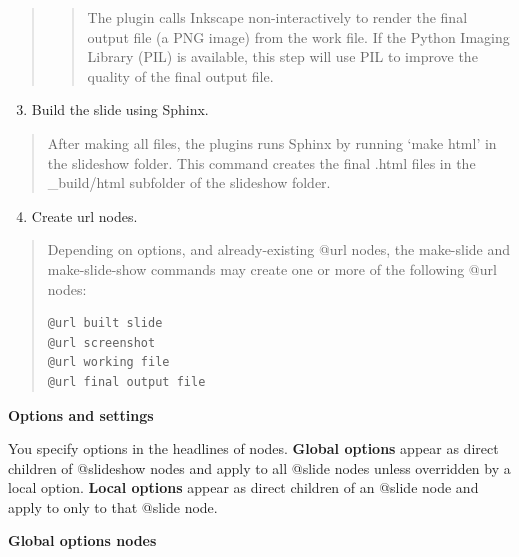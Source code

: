 \documentclass[a4paper,10pt,english]{sphinxmanual}
\begin{document}
\begin{quote}
\begin{enumerate}
\end{enumerate}
\begin{quote}

The plugin calls Inkscape non-interactively to
render the final output file (a PNG image)
from the work file. If the Python Imaging
Library (PIL) is available, this step will use
PIL to improve the quality of the final output
file.
\end{quote}
\end{quote}
\begin{enumerate}
\setcounter{enumi}{2}
\item {} 
Build the slide using Sphinx.

\end{enumerate}
\begin{quote}

After making all files, the plugins runs Sphinx
by running `make html' in the slideshow folder.
This command creates the final .html files in the
\_build/html subfolder of the slideshow folder.
\end{quote}
\begin{enumerate}
\setcounter{enumi}{3}
\item {} 
Create url nodes.

\end{enumerate}
\begin{quote}

Depending on options, and already-existing @url
nodes, the make-slide and make-slide-show
commands may create one or more of the following
@url nodes:

\begin{Verbatim}[commandchars=\\\{\}]
@url built slide
@url screenshot
@url working file
@url final output file
\end{Verbatim}
\end{quote}

\textbf{Options and settings}

You specify options in the headlines of nodes.
\textbf{Global options} appear as direct children of
@slideshow nodes and apply to all @slide nodes
unless overridden by a local option. \textbf{Local
options} appear as direct children of an @slide
node and apply to only to that @slide node.

\textbf{Global options nodes}
\end{document}
